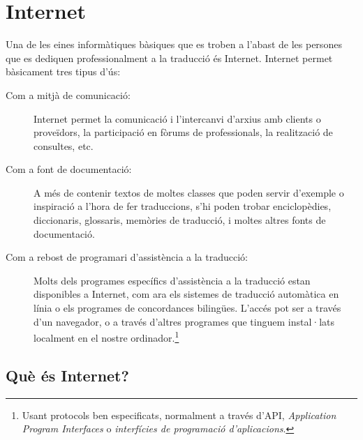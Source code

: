 \chapter{Internet}
\label{se:Internet}

Una de les eines informàtiques bàsiques que es troben a l'abast de les
persones que es dediquen professionalment a la traducció és
Internet. Internet permet bàsicament tres tipus d'ús:
\begin{description}
\item[Com a mitjà de comunicació:] Internet permet la comunicació
  i l'intercanvi d'arxius amb clients o proveïdors, la participació en fòrums de
  professionals, la realització de consultes, etc.
\item[Com a font de documentació:] A més de contenir textos de moltes
  classes que poden servir d'exemple o inspiració a l'hora de fer
  traduccions, s'hi poden trobar enciclopèdies, diccionaris,
  glossaris, memòries de traducció, i moltes altres fonts de
  documentació.
\item[Com a rebost de programari d'assistència a la traducció:] Molts
  dels programes específics d'assistència a la traducció estan
  disponibles a Internet, com ara els sistemes de traducció automàtica
  en línia o els programes de concordances bilingües. L'accés pot ser
  a través d'un navegador, o a través d'altres programes que tinguem
  instal·lats localment en el nostre ordinador.\footnote{Usant
    protocols ben especificats, normalment a través d'API,
    \emph{Application Program Interfaces} o \emph{interfícies de
      programació d'aplicacions}.}
\end{description}



\section{Què és Internet?}

